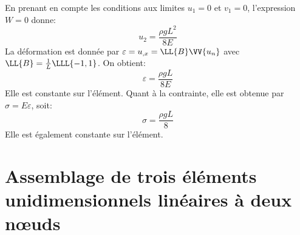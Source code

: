 \medskipvm
En prenant en compte les conditions aux limites $u_1=0$ et $v_1=0$, l'expression $W=0$ donne:
\begin{equation} u_2 = \frac{\rho g L^2}{8 E} \end{equation}
\medskipvm
La déformation est donnée par $\varepsilon=u_{,x}=\LL{B}\VV{u_n}$ avec $\LL{B}=\frac1L \LLL{-1, 1}$.
On obtient:
\begin{equation}
\varepsilon=\frac{\rho g L}{8 E}
\end{equation} 
Elle est constante sur l'élément. Quant à la contrainte, elle est obtenue par $\sigma=E\varepsilon$, soit:
\begin{equation}\sigma=\frac{\rho g L}8\end{equation} Elle est également constante sur l'élément.
\medskipvm
\ifVersionAvecExemplesSepares
   \section{Assemblage de trois éléments unidimensionnels linéaires à deux nœuds}\label{Sec-ass}
\else
